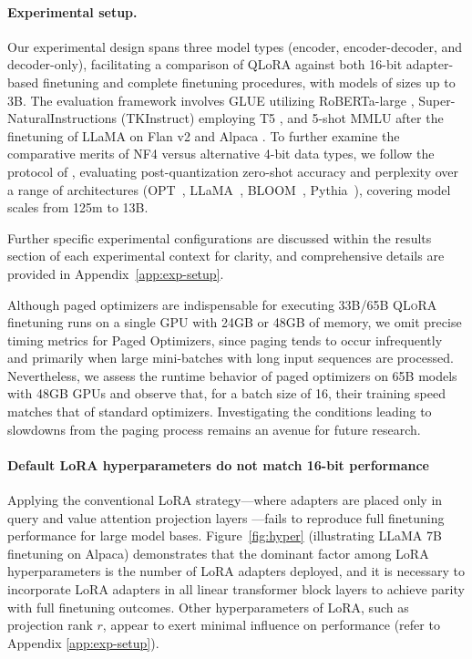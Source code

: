 \paragraph{Experimental setup.} Our experimental design spans three model types (encoder, encoder-decoder, and decoder-only), facilitating a comparison of QLoRA against both 16-bit adapter-based finetuning and complete finetuning procedures, with models of sizes up to 3B. The evaluation framework involves GLUE \citep{wang2018glue} utilizing RoBERTa-large \citep{liu2019roberta}, Super-NaturalInstructions (TKInstruct) \citep{wang2022super} employing T5 \citep{t5}, and 5-shot MMLU \citep{hendrycksmeasuring} after the finetuning of LLaMA on Flan v2 \citep{longpre2023flan} and Alpaca \citep{alpaca}. To further examine the comparative merits of NF4 versus alternative 4-bit data types, we follow the protocol of \citet{dettmers2022case}, evaluating post-quantization zero-shot accuracy and perplexity over a range of architectures (OPT~\citep{zhang2022opt}, LLaMA~\citep{touvron2023llama}, BLOOM~\citep{scao2022bloom}, Pythia~\citep{biderman2023pythia}), covering model scales from 125m to 13B.

Further specific experimental configurations are discussed within the results section of each experimental context for clarity, and comprehensive details are provided in Appendix~\ref{app:exp-setup}.

Although paged optimizers are indispensable for executing 33B/65B \textsc{QLoRA} finetuning runs on a single GPU with 24GB or 48GB of memory, we omit precise timing metrics for Paged Optimizers, since paging tends to occur infrequently and primarily when large mini-batches with long input sequences are processed. Nevertheless, we assess the runtime behavior of paged optimizers on 65B models with 48GB GPUs and observe that, for a batch size of 16, their training speed matches that of standard optimizers. Investigating the conditions leading to slowdowns from the paging process remains an avenue for future research.

\paragraph{Default LoRA hyperparameters do not match 16-bit performance}

Applying the conventional LoRA strategy—where adapters are placed only in query and value attention projection layers \citep{hu2021lora}—fails to reproduce full finetuning performance for large model bases. Figure~\ref{fig:hyper} (illustrating LLaMA 7B finetuning on Alpaca) demonstrates that the dominant factor among LoRA hyperparameters is the number of LoRA adapters deployed, and it is necessary to incorporate LoRA adapters in all linear transformer block layers to achieve parity with full finetuning outcomes. Other hyperparameters of LoRA, such as projection rank $r$, appear to exert minimal influence on performance (refer to Appendix \ref{app:exp-setup}).

